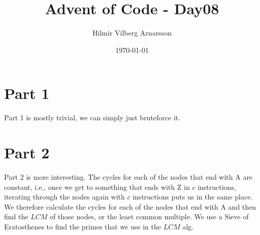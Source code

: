 \documentclass{article}
\begin{document}
\selectfont
\title{Advent of Code - Day08}
\author{Hilmir Vilberg Arnarsson}
\date{\today}

\maketitle
\clearpage
\setlength{\parskip}{1em}


\section*{Part 1}
Part 1 is mostly trivial, we can simply just bruteforce it.

\section*{Part 2}
Part 2 is more interesting. The cycles for each of the nodes that end with A are constant,
i.e., once we get to something that ends with Z in $c$ instructions, iterating through the nodes 
again with $c$ instructions puts us in the same place. We therefore calculate the cycles for each 
of the nodes that end with A and then find the $LCM$ of those nodes, or the least common multiple.
We use a Sieve of Eratosthenes to find the primes that we use in the $LCM$ alg.
\end{document}
